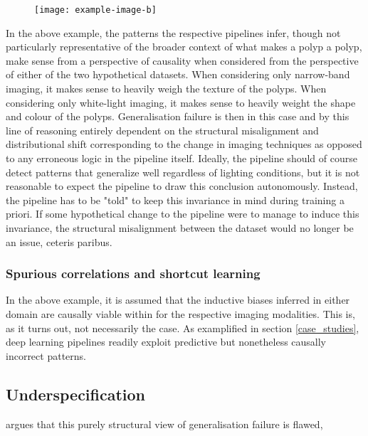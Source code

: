 		\begin{figure}[H]
			\texttt{[image: example-image-b]}
			\caption{}
			\label{imaging_modalities}
		\end{figure}


		In the above example, the patterns the respective pipelines infer,  though not particularly representative of the broader context of what makes a polyp a polyp, make sense from a perspective of causality when considered from the perspective of either of the two hypothetical datasets. When considering only narrow-band imaging, it makes sense to heavily weigh the texture of the polyps. When considering only white-light imaging, it makes sense to heavily weight the shape and colour of the polyps. Generalisation failure is then in this case and by this line of reasoning entirely dependent on the structural misalignment and distributional shift corresponding to the change in imaging techniques as opposed to any erroneous logic in the pipeline itself. Ideally, the pipeline should of course detect patterns that generalize well regardless of lighting conditions, but it is not reasonable to expect the pipeline to draw this conclusion autonomously. Instead, the pipeline has to be "told" to keep this invariance in mind during training a priori. If some hypothetical change to the pipeline were to manage to induce this invariance, the structural misalignment between the dataset would no longer be an issue, ceteris paribus.  
		
		\subsubsection{Spurious correlations and shortcut learning}
		In the above example, it is assumed that the inductive biases inferred in either domain are causally viable within for the respective imaging modalities. This is, as it turns out, not necessarily the case. As examplified in section \ref{case_studies}, deep learning pipelines readily exploit predictive but nonetheless causally incorrect patterns. 
		
		
		\subsection{Underspecification}
		\cite{damour2020underspecification} argues that this purely structural view of generalisation failure is flawed, 
			
